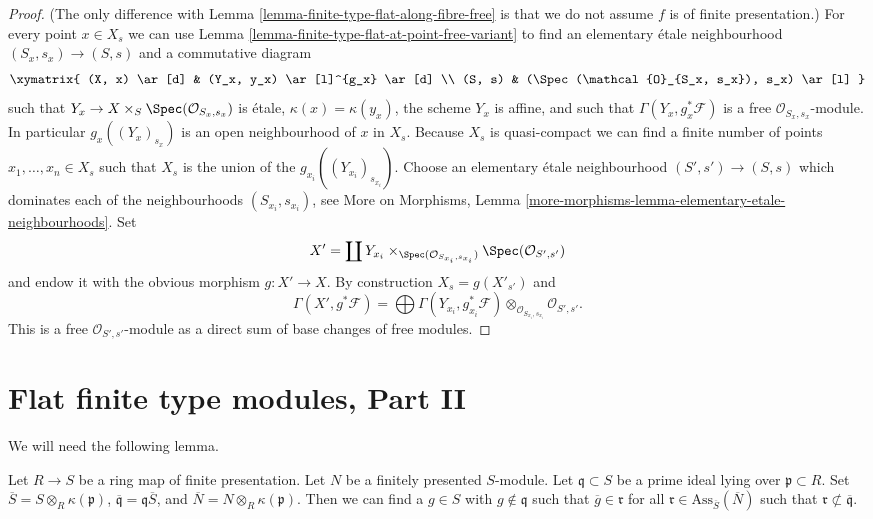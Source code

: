 \begin{proof}
(The only difference with
Lemma \ref{lemma-finite-type-flat-along-fibre-free}
is that we do not assume $f$ is of finite presentation.)
For every point $x \in X_s$ we can use
Lemma \ref{lemma-finite-type-flat-at-point-free-variant}
to find an elementary \'etale neighbourhood $(S_x , s_x) \to (S, s)$
and a commutative diagram
$$
\xymatrix{
(X, x) \ar[d] & (Y_x, y_x) \ar[l]^{g_x} \ar[d] \\
(S, s) & (\Spec(\mathcal{O}_{S_x, s_x}), s_x) \ar[l]
}
$$
such that $Y_x \to X \times_S \Spec(\mathcal{O}_{S_x, s_x})$
is \'etale, $\kappa(x) = \kappa(y_x)$, the scheme $Y_x$ is affine, and
such that $\Gamma(Y_x, g_x^*\mathcal{F})$ is a free
$\mathcal{O}_{S_x, s_x}$-module. In particular
$g_x((Y_x)_{s_x})$ is an open neighbourhood of $x$ in $X_s$.
Because $X_s$ is quasi-compact we can find a finite number of points
$x_1, \ldots, x_n \in X_s$ such that $X_s$ is the union of
the $g_{x_i}((Y_{x_i})_{s_{x_i}})$. Choose an elementary \'etale neighbourhood
$(S' , s') \to (S, s)$ which dominates each of the neighbourhoods
$(S_{x_i}, s_{x_i})$, see
More on Morphisms,
Lemma \ref{more-morphisms-lemma-elementary-etale-neighbourhoods}.
Set
$$
X' = \coprod Y_{x_i} \times_{\Spec(\mathcal{O}_{S_{x_i}, s_{x_i}})}
\Spec(\mathcal{O}_{S', s'})
$$
and endow it with the obvious morphism $g : X' \to X$.
By construction $X_s = g(X'_{s'})$ and
$$
\Gamma(X', g^*\mathcal{F})
=
\bigoplus \Gamma(Y_{x_i}, g_{x_i}^*\mathcal{F})
\otimes_{\mathcal{O}_{S_{x_i}, s_{x_i}}}
\mathcal{O}_{S', s'}.
$$
This is a free $\mathcal{O}_{S', s'}$-module as a direct sum
of base changes of free modules.
\end{proof}




\section{Flat finite type modules, Part II}
\label{section-finite-type-flat-II}

\noindent
We will need the following lemma.

\begin{lemma}
\label{lemma-weak-bourbaki-pre-pre}
Let $R \to S$ be a ring map of finite presentation. Let $N$ be a
finitely presented $S$-module. Let $\mathfrak q \subset S$ be a prime ideal
lying over $\mathfrak p \subset R$. Set
$\overline{S} = S \otimes_R \kappa(\mathfrak p)$,
$\overline{\mathfrak q} = \mathfrak q \overline{S}$, and
$\overline{N} = N \otimes_R \kappa(\mathfrak p)$. Then
we can find a $g \in S$ with
$g \not \in \mathfrak q$ such that
$\overline{g} \in \mathfrak r$ for all
$\mathfrak r \in \text{Ass}_{\overline{S}}(\overline{N})$
such that $\mathfrak r \not \subset \overline{\mathfrak q}$.
\end{lemma}

